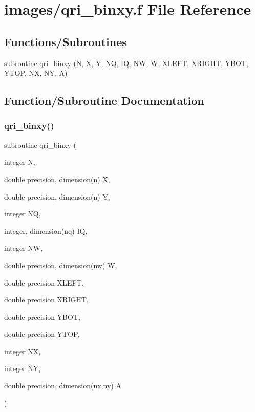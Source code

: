 \hypertarget{qri__binxy_8f}{}\section{images/qri\+\_\+binxy.f File Reference}
\label{qri__binxy_8f}
\subsection*{Functions/\+Subroutines}
\begin{DoxyCompactItemize}
\item 
subroutine \hyperlink{qri__binxy_8f_ae717e08b830667ffcc77556bb1c99b4a}{qri\+\_\+binxy} (N, X, Y, NQ, IQ, NW, W, X\+L\+E\+FT, X\+R\+I\+G\+HT, Y\+B\+OT, Y\+T\+OP, NX, NY, A)
\end{DoxyCompactItemize}


\subsection{Function/\+Subroutine Documentation}
\mbox{\label{qri__binxy_8f_ae717e08b830667ffcc77556bb1c99b4a}} 
\subsubsection{\texorpdfstring{qri\+\_\+binxy()}{qri\_binxy()}}
{\footnotesize\ttfamily subroutine qri\+\_\+binxy (\begin{DoxyParamCaption}\item[{integer}]{N,  }\item[{double precision, dimension(n)}]{X,  }\item[{double precision, dimension(n)}]{Y,  }\item[{integer}]{NQ,  }\item[{integer, dimension(nq)}]{IQ,  }\item[{integer}]{NW,  }\item[{double precision, dimension(nw)}]{W,  }\item[{double precision}]{X\+L\+E\+FT,  }\item[{double precision}]{X\+R\+I\+G\+HT,  }\item[{double precision}]{Y\+B\+OT,  }\item[{double precision}]{Y\+T\+OP,  }\item[{integer}]{NX,  }\item[{integer}]{NY,  }\item[{double precision, dimension(nx,ny)}]{A }\end{DoxyParamCaption})}

